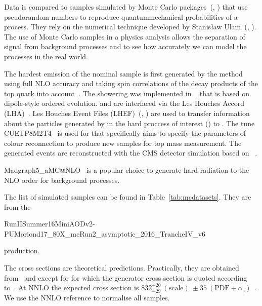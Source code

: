 Data is compared to samples simulated by Monte Carlo packages~(\cite{Webber:1986mc}, \cite{Sjostrand:2006su}) that use pseudorandom numbers to reproduce quantummechanical probabilities of a process. They rely on the numerical technique developed by Stanisław Ulam~(\cite{Eckart}, \cite{Metropolis}). The use of Monte Carlo samples in a physics analysis allows the separation of signal from background processes and to see how accurately we can model the processes in the real world.

The hardest emission of the nominal \ttbar sample is first generated by the \POWHEG method~\cite{Frixione:2007vw} using full NLO accuracy and taking spin correlations of the decay products of the top quark into account~\cite{Frixione:2007nw}. The showering was implemented in ~\cite{Sjostrand:2014zea} that is based on dipole-style \pt ordered evolution. \POWHEG and  are interfaced via the Les Houches Accord (LHA)~\cite{Boos:2001cv}. Les Houches Event Files (LHEF)~(\cite{Alwall:2006yp}, \cite{Andersen:2014efa}) are used to transfer information about the particles generated by \POWHEG in the hard proccess of interest (\ttbar) to . The tune CUETP8M2T4~\cite{Kovalchuk:CR} is used for  that specifically aims to specify the parameters of colour reconnection to produce new samples for top mass measurement. The generated events are reconstructed with the CMS detector simulation based on \GEANTfour~\cite{Agostinelli:2002hh}.

Madgraph5\_aMC@NLO~\cite{Alwall:2014hca} is a popular choice to generate hard radiation to the NLO order for background processes. 

The list of simulated samples can be found in Table~\ref{tab:mcdatasets}. They are from the

RunIISummer16MiniAODv2-PUMoriond17\_80X\_mcRun2\_asymptotic\_2016\_TrancheIV\_v6

production.

The cross sections are theoretical predictions. Practically, they are obtained from~\cite{twiki:SingleTopRefXsec} and \cite{twiki:SM13} except for \ttbar for which the generator cross section is quoted according to~\cite{site:MCM}. At NNLO the expected \ttbar cross section is $832^{+20}_{-29}~(\text{scale})~\pm 35~(\text{PDF}+\alpha_\text{s})$~\cite{twiki:TTbarNLO}. We use the NNLO reference to normalise all \ttbar samples.


